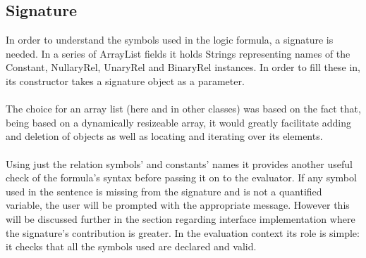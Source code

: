 \documentclass{report}
\begin{document}
\subsection{Signature}
In order to understand the symbols used in the logic formula, a signature is 
needed. In a series of ArrayList fields it holds Strings representing names of 
the Constant, NullaryRel, UnaryRel and BinaryRel instances. In order to fill 
these in, its constructor takes a signature object as a parameter.
\\ \\
The choice for an array list (here and in other classes) was based on the fact 
that, being based on a dynamically resizeable array, it would greatly facilitate 
adding and deletion of objects as well as locating and iterating over its 
elements. 
\\ \\
Using just the relation symbols' and constants' names it provides another useful 
check of the formula's syntax before passing it on to the evaluator. If any 
symbol used in the sentence is missing from the signature and is not a 
quantified variable, the user will be prompted with the appropriate message. 
However this will be discussed further in the section regarding interface 
implementation where the signature's contribution is greater. In the evaluation 
context its role is simple: it checks that all the symbols used are declared 
and valid.
\end{document}
